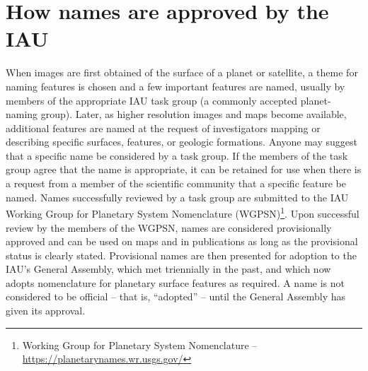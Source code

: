 \section{How names are approved by the IAU}
\label{sec:Nomenclature:ApprovingNames}
When images are first obtained of the surface of a planet or satellite, a theme for naming features is chosen and a few important features are named, usually by members of the appropriate IAU task group (a commonly accepted planet-naming group). Later, as higher resolution images and maps become available, additional features are named at the request of investigators mapping or describing specific surfaces, features, or geologic formations. Anyone may suggest that a specific name be considered by a task group. If the members of the task group agree that the name is appropriate, it can be retained for use when there is a request from a member of the scientific community that a specific feature be named. Names successfully reviewed by a task group are submitted to the IAU Working Group for Planetary System Nomenclature (WGPSN)\footnote{Working Group for Planetary System Nomenclature -- \url{https://planetarynames.wr.usgs.gov/}}. Upon successful review by the members of the WGPSN, names are considered provisionally approved and can be used on maps and in publications as long as the provisional status is clearly stated. Provisional names are then presented for adoption to the IAU's General Assembly, which met triennially in the past, and which now adopts nomenclature for planetary surface features as required. A name is not considered to be official -- that is, ``adopted'' -- until the General Assembly has given its approval.

